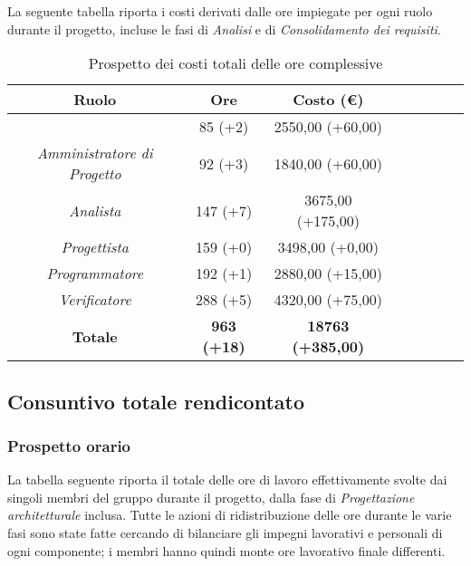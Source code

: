La seguente tabella riporta i costi derivati dalle ore impiegate per ogni ruolo durante il progetto, incluse le fasi di \textit{Analisi} e di \textit{Consolidamento dei requisiti}.

\begin{table}[H]
		\begin{center}
			\setlength{\aboverulesep}{0pt}
			\setlength{\belowrulesep}{0pt}
			\setlength{\extrarowheight}{.75ex}
			\begin{tabular}{ c c c c c c c c }
				\rowcolor{AzzurroGruppo!30} 
				\textbf{Ruolo} & \textbf{Ore} & \textbf{Costo (\euro{})}\\
				\toprule
				\RdP{}   & 85 (+2) & 2550,00 (+60,00)\\
				\textit{Amministratore di Progetto} & 92 (+3) & 1840,00 (+60,00) \\
				\textit{Analista}       & 147 (+7) & 3675,00 (+175,00) \\
				\textit{Progettista}    & 159 (+0) & 3498,00 (+0,00) \\
				\textit{Programmatore}  & 192 (+1) & 2880,00 (+15,00) \\
				\textit{Verificatore}   & 288 (+5) & 4320,00 (+75,00)\\
				\textbf{Totale} & \textbf{963 (+18)} & \textbf{18763 (+385,00)} \\
				\bottomrule
			\end{tabular}
			\caption{Prospetto dei costi totali delle ore complessive}
		\end{center}
	\end{table}
	
\subsection{Consuntivo totale rendicontato}

\subsubsection{Prospetto orario}
La tabella seguente riporta il totale delle ore di lavoro effettivamente svolte dai singoli membri del gruppo durante il progetto, dalla fase di \textit{Progettazione architetturale} inclusa. Tutte le azioni di ridistribuzione delle ore durante le varie fasi sono state fatte cercando di bilanciare gli impegni lavorativi e personali di ogni componente; i membri hanno quindi monte ore lavorativo finale differenti.

